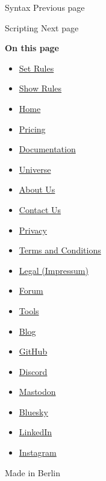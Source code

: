 \href{/docs/reference/syntax/}{\pandocbounded{}}

{ Syntax } { Previous page }

\href{/docs/reference/scripting/}{\pandocbounded{}}

{ Scripting } { Next page }

\textbf{On this page}

\begin{itemize}
\tightlist
\item
  \hyperref[set-rules]{Set Rules}
\item
  \hyperref[show-rules]{Show Rules}
\end{itemize}

\begin{itemize}
\tightlist
\item
  \href{/}{Home}
\item
  \href{/pricing/}{Pricing}
\item
  \href{/docs/}{Documentation}
\item
  \href{/universe/}{Universe}
\item
  \href{/about/}{About Us}
\item
  \href{/contact/}{Contact Us}
\item
  \href{/privacy/}{Privacy}
\item
  \href{https://typst.app/terms}{Terms and Conditions}
\item
  \href{/legal/}{Legal (Impressum)}
\end{itemize}

\begin{itemize}
\tightlist
\item
  \href{https://forum.typst.app}{Forum}
\item
  \href{/tools/}{Tools}
\item
  \href{/blog/}{Blog}
\item
  \href{https://github.com/typst/}{GitHub}
\item
  \href{https://discord.gg/2uDybryKPe}{Discord}
\item
  \href{https://mastodon.social/@typst}{Mastodon}
\item
  \href{https://bsky.app/profile/typst.app}{Bluesky}
\item
  \href{https://www.linkedin.com/company/typst/}{LinkedIn}
\item
  \href{https://instagram.com/typstapp/}{Instagram}
\end{itemize}

Made in Berlin
